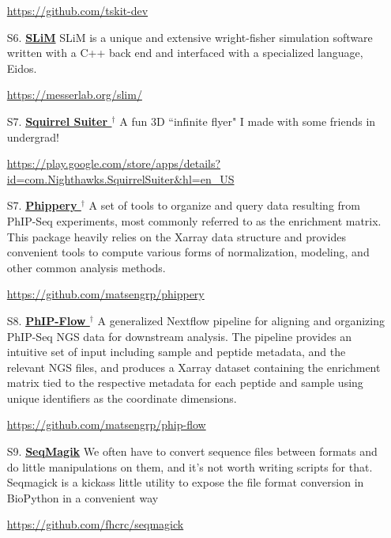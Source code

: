 \documentclass[letterpaper,11pt]{article}
\let\oldhref\href
\renewcommand{\href}[2]{\oldhref{#1}{\bfseries#2}}
\begin{document}
\begin{enumerate}
        \space \url{https://github.com/tskit-dev}

\item [S6.] \href{https://messerlab.org/slim/}{SLiM} \space \space
        SLiM is a unique and extensive wright-fisher simulation software written with a C++ back end and 
        interfaced with a specialized language, Eidos.
        
        \space \url{https://messerlab.org/slim/}

\item [S7.] \href{https://play.google.com/store/apps/details?id=com.Nighthawks.SquirrelSuiter&hl=en_US}{Squirrel Suiter $^{\dagger}$} 
        \space \space A fun 3D ``infinite flyer" I made with some friends in undergrad! 
        
        \space \url{https://play.google.com/store/apps/details?id=com.Nighthawks.SquirrelSuiter&hl=en_US}

\item [S7.] \href{https://github.com/matsengrp/phippery}{Phippery $^{\dagger}$} 
        \space \space A set of tools to organize and query data resulting from PhIP-Seq experiments, most commonly 
        referred to as the enrichment matrix.
        This package heavily relies on the Xarray data structure and provides convenient tools to compute
        various forms of normalization, modeling, and other common analysis methods.
        
        \space \url{https://github.com/matsengrp/phippery}

\item [S8.] \href{https://github.com/matsengrp/phip-flow}{PhIP-Flow $^{\dagger}$}
        \space \space A generalized Nextflow pipeline for aligning and organizing PhIP-Seq NGS data for downstream analysis.
        The pipeline provides an intuitive set of input including sample and peptide metadata, and the relevant NGS files,
        and produces a Xarray dataset containing the enrichment matrix tied to the respective metadata for each peptide and sample using unique
        identifiers as the coordinate dimensions. 

        \space \url{https://github.com/matsengrp/phip-flow}

\item [S9.] \href{https://github.com/fhcrc/seqmagick}{SeqMagik}
        \space \space We often have to convert sequence files between formats and do little manipulations on them, 
        and it's not worth writing scripts for that. 
        Seqmagick is a kickass little utility to expose the file format conversion in BioPython in a convenient way

        \space \url{https://github.com/fhcrc/seqmagick}


\end{enumerate}
\end{document}
